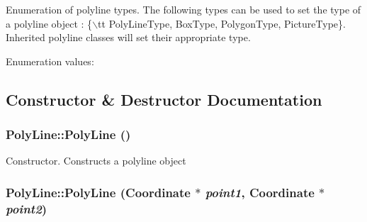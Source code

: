 Enumeration of polyline types. The following types can be used to set the type of a polyline object : \{$\backslash$tt Poly\-Line\-Type, Box\-Type, Polygon\-Type, Picture\-Type\}. Inherited polyline classes will set their appropriate type. \begin{Desc}
\item[Enumeration values: ]\par
\begin{description}
\item[{\em 
{\em Poly\-Line\-Type}\label{classPolyLine_s5s0}
}]\item[{\em 
{\em Box\-Type}\label{classPolyLine_s5s1}
}]\item[{\em 
{\em Polygon\-Type}\label{classPolyLine_s5s2}
}]\item[{\em 
{\em Arc\-Box\-Type}\label{classPolyLine_s5s3}
}]\item[{\em 
{\em Picture\-Type}\label{classPolyLine_s5s4}
}]\end{description}
\end{Desc}



\subsection{Constructor \& Destructor Documentation}
\subsubsection{\setlength{\rightskip}{0pt plus 5cm}Poly\-Line::Poly\-Line ()}\label{classPolyLine_a0}


Constructor. Constructs a polyline object 
\subsubsection{\setlength{\rightskip}{0pt plus 5cm}Poly\-Line::Poly\-Line ({\bf Coordinate} $\ast$ {\em point1}, {\bf Coordinate} $\ast$ {\em point2})}\label{classPolyLine_a1}


